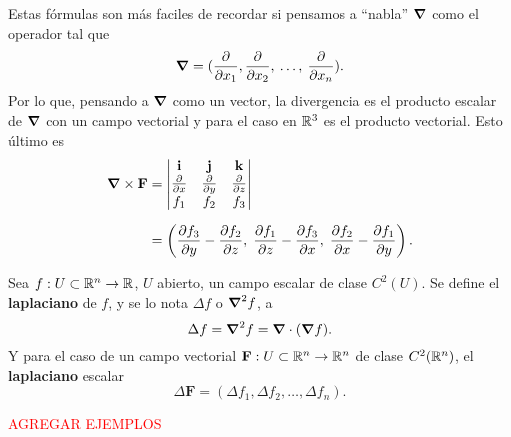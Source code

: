 \begin{obs}
    Estas f\'ormulas son m\'as faciles de recordar si pensamos a ``nabla'' $\grad$ como el operador tal que 
    \[
        \grad = (\frac{\partial}{\partial x_1},\frac{\partial}{\partial x_2},\:\ldots,\: \frac{\partial}{\partial x_n}).  
    \]
    Por lo que, pensando a $\grad$ como un vector, la divergencia es el producto escalar de $\grad$ con un campo vectorial y para el caso en $\mathbb{R}^3$ es el producto vectorial. Esto \'ultimo es
    \begin{align*}
        \grad\times\mathbf{F}&= 
        \begin{vmatrix}
        \mathbf{i} & \mathbf{j} & \mathbf{k} \\
        \frac{\partial}{\partial x} & \frac{\partial}{\partial y} & \frac{\partial}{\partial z} \\
        f_1 & f_2 & f_3
        \end{vmatrix} \\[.2cm]
        &=\left(\frac{\partial f_3}{\partial y}-\frac{\partial f_2}{\partial z},\;\frac{\partial f_1}{\partial z}-\frac{\partial f_3}{\partial x},\;\frac{\partial f_2}{\partial x}-\frac{\partial f_1}{\partial y}\right).
    \end{align*}
\end{obs}
\begin{definition}
    Sea $f:U\subset\mathbb{R}^n\to\mathbb{R}$, $U$ abierto, un campo escalar de clase $C^2(U)$. Se define el \textbf{laplaciano} de $f$, y se lo nota $\Delta f$ o $\grad^2 f$, a
    \[
        \Delta f=\grad^2f=\grad\cdot(\grad f).  
    \]
    Y para el caso de un campo vectorial $\mathbf{F}:U\subset\mathbb{R}^n\to\mathbb{R}^n$ de clase $C^2(\mathbb{R}^n)$, el \textbf{laplaciano} escalar
    \[
        \Delta\mathbf{F}=(\Delta f_1,\Delta f_2,\ldots,\Delta f_n). 
    \]
\end{definition}

\textcolor{red}{AGREGAR EJEMPLOS}

